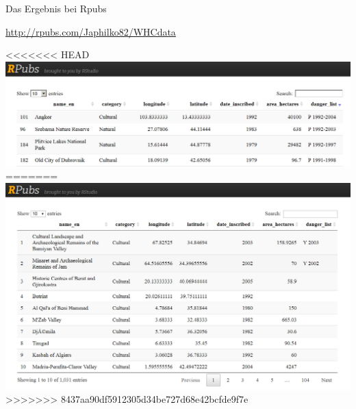\documentclass[ignorenonframetext,]{beamer}
\begin{document}
\begin{frame}{Das Ergebnis bei Rpubs}

\url{http://rpubs.com/Japhilko82/WHCdata}

\textless{}\textless{}\textless{}\textless{}\textless{}\textless{}\textless{}
HEAD
\includegraphics{./tex2pdf.956/01040098b8f6032936421c020a37ff8b059045d6.png}
======= \includegraphics{../figure/WHCRpubs.PNG}
\textgreater{}\textgreater{}\textgreater{}\textgreater{}\textgreater{}\textgreater{}\textgreater{}
8437aa90df5912305d34be727d68e42bcfde9f7e

\end{frame}
\end{document}
